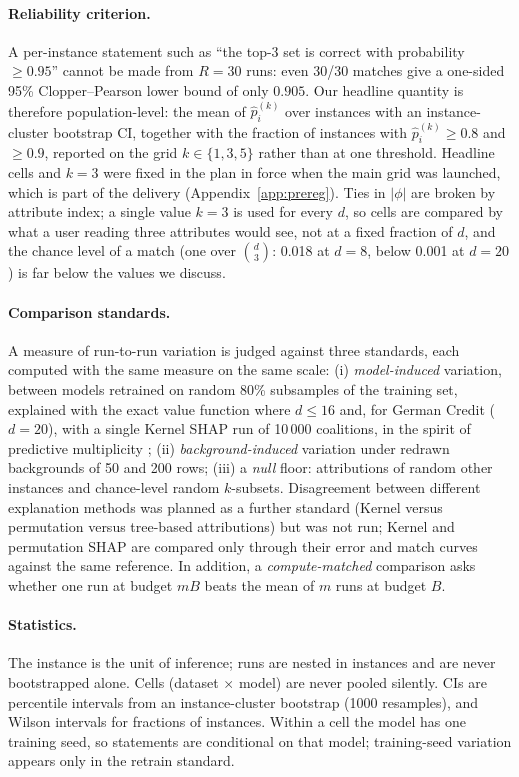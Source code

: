 \paragraph{Reliability criterion.}
A per-instance statement such as ``the top-3 set is correct with probability $\ge 0.95$'' cannot be made from $R=30$ runs: even 30/30 matches give a one-sided 95\% Clopper--Pearson lower bound of only $0.905$. Our headline quantity is therefore population-level: the mean of $\hat p_i^{(k)}$ over instances with an instance-cluster bootstrap CI, together with the fraction of instances with $\hat p_i^{(k)}\ge 0.8$ and $\ge0.9$, reported on the grid $k\in\{1,3,5\}$ rather than at one threshold. Headline cells and $k=3$ were fixed in the plan in force when the main grid was launched, which is part of the delivery (Appendix~\ref{app:prereg}). Ties in $|\phi|$ are broken by attribute index; a single value $k=3$ is used for every $d$, so cells are compared by what a user reading three attributes would see, not at a fixed fraction of $d$, and the chance level of a match (one over $\binom{d}{3}$: 0.018 at $d=8$, below 0.001 at $d=20$) is far below the values we discuss.

\paragraph{Comparison standards.}
A measure of run-to-run variation is judged against three standards, each computed with the same measure on the same scale: (i) \emph{model-induced} variation, between models retrained on random 80\% subsamples of the training set, explained with the exact value function where $d\le16$ and, for German Credit ($d=20$), with a single Kernel SHAP run of 10\,000 coalitions, in the spirit of predictive multiplicity \citep{marx2020predictive}; (ii) \emph{background-induced} variation under redrawn backgrounds of 50 and 200 rows; (iii) a \emph{null} floor: attributions of random other instances and chance-level random $k$-subsets. Disagreement between different explanation methods \citep{krishna2022disagreement} was planned as a further standard (Kernel versus permutation versus tree-based attributions) but was not run; Kernel and permutation SHAP are compared only through their error and match curves against the same reference. In addition, a \emph{compute-matched} comparison asks whether one run at budget $mB$ beats the mean of $m$ runs at budget $B$.

\paragraph{Statistics.}
The instance is the unit of inference; runs are nested in instances and are never bootstrapped alone. Cells (dataset $\times$ model) are never pooled silently. CIs are percentile intervals from an instance-cluster bootstrap (1000 resamples), and Wilson intervals for fractions of instances. Within a cell the model has one training seed, so statements are conditional on that model; training-seed variation appears only in the retrain standard.
